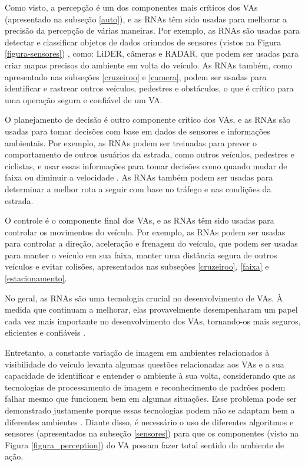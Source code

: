 Como visto, a percepção é um dos componentes mais críticos dos VAs (apresentado na subseção \ref{auto}), e as RNAs têm sido usadas para melhorar a precisão da percepção de várias maneiras. 
Por exemplo, as  RNAs são usadas para detectar e classificar objetos de dados oriundos de sensores (vistos na Figura \ref{figura-sensores}) , como: LiDER, câmeras e RADAR, que podem ser usadas para criar mapas precisos do ambiente em volta do veículo. 
As RNAs também, como apresentado nas subseções \ref{cruzeiroo} e \ref{camera}, podem ser usadas para identificar e rastrear outros veículos, pedestres e obstáculos, o que é crítico para uma operação segura e confiável de um VA.

O planejamento de decisão é outro componente crítico dos VAs, e as  RNAs são usadas para tomar decisões com base em dados de sensores e informações ambientais. Por exemplo, as RNAs podem ser treinadas para prever o comportamento de outros usuários da estrada, como outros veículos, pedestres e ciclistas, e usar essas informações para tomar decisões como quando mudar de faixa ou diminuir a velocidade \cite{aplicacao2}. As RNAs também podem ser usadas para determinar a melhor rota a seguir com base no tráfego e nas condições da estrada. 

O controle é o componente final dos VAs, e as RNAs têm sido usadas para controlar os movimentos do veículo. Por exemplo, as  RNAs podem ser usadas para controlar a direção, aceleração e frenagem do veículo, que podem ser usadas para manter o veículo em sua faixa, manter uma distância segura de outros veículos e evitar colisões, apresentados nas subseções \ref{cruzeiroo}, \ref{faixa} e \ref{estacionamento}.

No geral, as RNAs são uma tecnologia crucial no desenvolvimento de VAs. À medida que continuam a melhorar, elas provavelmente desempenharam um papel cada vez mais importante no desenvolvimento dos VAs, tornando-os mais seguros, eficientes e confiáveis \cite{sensors-yet, aplicacao2}.


Entretanto, a constante variação de imagem em ambientes relacionados à visibilidade do veículo levanta algumas questões relacionadas aos VAs e a sua capacidade de identificar e entender o ambiente à sua volta, considerando que as tecnologias de processamento de imagem e reconhecimento de padrões podem falhar mesmo que funcionem bem em algumas situações. Esse problema pode ser demonstrado justamente porque essas tecnologias podem não se adaptam bem a diferentes ambientes \cite{caio}. Diante disso, é necessário o uso de diferentes algoritmos e sensores (apresentados na subseção \ref{sensores}) para que os componentes (visto na Figura \ref{figura_perception}) do VA possam fazer total sentido do ambiente de ação.

